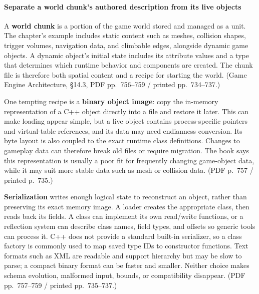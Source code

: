 \paragraph{Separate a world chunk's authored description from its live objects}\label{06-engine-ii-ch032-separate-a-world-chunks-authored-description-from-its-live-objects}

\hypertarget{06-engine-ii-ch032-separate-a-world-chunks-authored-description-from-its-live-objects}{}

A \textbf{world chunk} is a portion of the game world stored and managed as a unit. The chapter's example includes static content such as meshes, collision shapes, trigger volumes, navigation data, and climbable edges, alongside dynamic game objects. A dynamic object's initial state includes its attribute values and a type that determines which runtime behavior and components are created. The chunk file is therefore both spatial content and a recipe for starting the world. (Game Engine Architecture, §14.3, PDF pp.~756--759 / printed pp.~734--737.)

One tempting recipe is a \textbf{binary object image}: copy the in-memory representation of a C++ object directly into a file and restore it later. This can make loading appear simple, but a live object contains process-specific pointers and virtual-table references, and its data may need endianness conversion. Its byte layout is also coupled to the exact runtime class definitions. Changes to gameplay data can therefore break old files or require migration. The book says this representation is usually a poor fit for frequently changing game-object data, while it may suit more stable data such as mesh or collision data. (PDF p.~757 / printed p.~735.)

\textbf{Serialization} writes enough logical state to reconstruct an object, rather than preserving its exact memory image. A loader creates the appropriate class, then reads back its fields. A class can implement its own read/write functions, or a reflection system can describe class names, field types, and offsets so generic tools can process it. C++ does not provide a standard built-in serializer, so a class factory is commonly used to map saved type IDs to constructor functions. Text formats such as XML are readable and support hierarchy but may be slow to parse; a compact binary format can be faster and smaller. Neither choice makes schema evolution, malformed input, bounds, or compatibility disappear. (PDF pp.~757--759 / printed pp.~735--737.)

